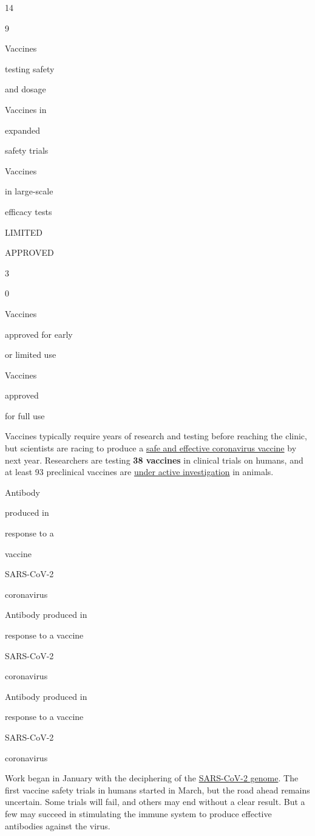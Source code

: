 14

9

Vaccines

testing safety

and dosage

Vaccines in

expanded

safety trials

Vaccines

in large-scale

efficacy tests

LIMITED

APPROVED

3

0

Vaccines

approved for early

or limited use

Vaccines

approved

for full use

Vaccines typically require years of research and testing before reaching
the clinic, but scientists are racing to produce a
\href{https://www.nytimes3xbfgragh.onion/interactive/2020/05/20/science/coronavirus-vaccine-development.html}{safe
and effective coronavirus vaccine} by next year. Researchers are testing
\textbf{\textbf{38 vaccines}} in clinical trials on humans, and at least
93 preclinical vaccines are
\href{https://www.nytimes3xbfgragh.onion/2020/08/27/health/covid-19-vaccines.html}{under
active investigation} in animals.

Antibody

produced in

response to a

vaccine

SARS-CoV-2

coronavirus

Antibody produced in

response to a vaccine

SARS-CoV-2

coronavirus

Antibody produced in

response to a vaccine

SARS-CoV-2

coronavirus

Work began in January with the deciphering of the
\href{https://www.nytimes3xbfgragh.onion/interactive/2020/04/03/science/coronavirus-genome-bad-news-wrapped-in-protein.html}{SARS-CoV-2
genome}. The first vaccine safety trials in humans started in March, but
the road ahead remains uncertain. Some trials will fail, and others may
end without a clear result. But a few may succeed in stimulating the
immune system to produce effective antibodies against the virus.

